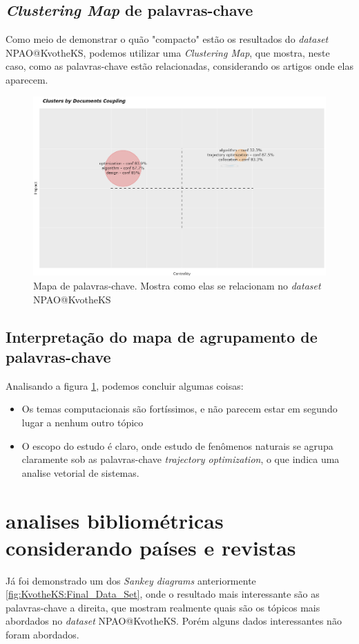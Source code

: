 \subsection{\emph{Clustering Map} de palavras-chave}
    Como meio de demonstrar o quão "compacto" estão os resultados do \emph{dataset} NPAO@KvotheKS, podemos utilizar uma \emph{Clustering Map}, que mostra, neste caso, como as palavras-chave estão relacionadas, considerando os artigos onde elas aparecem.
\begin{figure}[H]
    \centering
    \includegraphics[width=1\textwidth]{experiments/KvotheKS/PesqBibliogr/AlgoritmosSimulacaoOptica-Dinamica/WoS-20220202/Clustering/Cluster_map.png}
    \caption{Mapa de palavras-chave. Mostra como elas se relacionam no \emph{dataset} NPAO@KvotheKS}
    \label{fig:KvotheKS:Cluster_}
\end{figure}

\subsection{Interpretação do mapa de agrupamento de palavras-chave}
    Analisando a figura \ref{fig:KvotheKS:Cluster_}, podemos concluir algumas coisas:
    \begin{itemize}
        \item Os temas computacionais são fortíssimos, e não parecem estar em segundo lugar a nenhum outro tópico
        \item O escopo do estudo é claro, onde estudo de fenômenos naturais se agrupa claramente sob as palavras-chave \emph{trajectory optimization}, o que indica uma analise vetorial de sistemas.
    \end{itemize}
    
\section{analises bibliométricas considerando países e revistas}
    Já foi demonstrado um dos \emph{Sankey diagrams} anteriormente \ref{fig:KvotheKS:Final_Data_Set}, onde o resultado mais interessante são as palavras-chave a direita, que mostram realmente quais são os tópicos mais abordados no \emph{dataset} NPAO@KvotheKS. Porém alguns dados interessantes não foram abordados.
    
